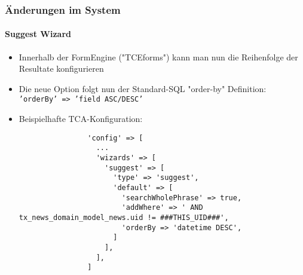 \begin{frame}[fragile]
	\frametitle{Änderungen im System}
	\framesubtitle{Suggest Wizard}

	\lstset{basicstyle=\tiny\ttfamily}

	\begin{itemize}
		\item Innerhalb der FormEngine ("TCEforms") kann man nun die Reihenfolge der Resultate konfigurieren
		\item Die neue Option folgt nun der Standard-SQL "order-by" Definition:\newline
			\small\texttt{'orderBy' => 'field ASC/DESC'}\normalsize
		\item Beispielhafte TCA-Konfiguration:

			\begin{lstlisting}
				'config' => [
				  ...
				  'wizards' => [
				    'suggest' => [
				      'type' => 'suggest',
				      'default' => [
				        'searchWholePhrase' => true,
				        'addWhere' => ' AND tx_news_domain_model_news.uid != ###THIS_UID###',
				        'orderBy => 'datetime DESC',
				      ]
				    ],
				  ],
				]
			\end{lstlisting}

	\end{itemize}

\end{frame}


